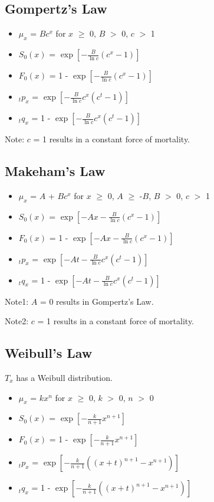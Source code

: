 \documentclass[]{book}
\begin{document}
\subsection{Gompertz's Law}\label{gompertzs-law}

\begin{itemize}
\item
  \(\mu_x\) = \(Bc^x\) for \(x\) \(\ge\) 0, \(B\) \(>\) 0, \(c\) \(>\) 1
\item
  \(S_0(x)\) = \(\exp[-\frac{B}{\ln c}(c^x - 1)]\)
\item
  \(F_0(x)\) = 1 - \(\exp[-\frac{B}{\ln c}(c^x - 1)]\)
\item
  \({}_{t}p_x\) = \(\exp[-\frac{B}{\ln c}c^x(c^t - 1)]\)
\item
  \({}_{t}q_x\) = 1 - \(\exp[-\frac{B}{\ln c}c^x(c^t - 1)]\)
\end{itemize}

Note: \(c\) = 1 results in a constant force of mortality.

\subsection{Makeham's Law}\label{makehams-law}

\begin{itemize}
\item
  \(\mu_x\) = \(A\) + \(Bc^x\) for \(x\) \(\ge\) 0, \(A\) \(\ge\)
  -\(B\), \(B\) \(>\) 0, \(c\) \(>\) 1
\item
  \(S_0(x)\) = \(\exp[-Ax - \frac{B}{\ln c}(c^x - 1)]\)
\item
  \(F_0(x)\) = 1 - \(\exp[-Ax - \frac{B}{\ln c}(c^x - 1)]\)
\item
  \({}_{t}p_x\) = \(\exp[-At - \frac{B}{\ln c}c^x(c^t - 1)]\)
\item
  \({}_{t}q_x\) = 1 - \(\exp[-At - \frac{B}{\ln c}c^x(c^t - 1)]\)
\end{itemize}

Note1: \(A\) = 0 results in Gompertz's Law.

Note2: \(c\) = 1 results in a constant force of mortality.

\subsection{Weibull's Law}\label{weibulls-law}

\(T_x\) has a Weibull distribution.

\begin{itemize}
\item
  \(\mu_x\) = \(k\)\(x^n\) for \(x\) \(\ge\) 0, \(k\) \(>\) 0, \(n\)
  \(>\) 0
\item
  \(S_0(x)\) = \(\exp[-\frac{k}{n + 1}x^{n + 1}]\)
\item
  \(F_0(x)\) = 1 - \(\exp[-\frac{k}{n + 1}x^{n + 1}]\)
\item
  \({}_{t}p_x\) =
  \(\exp[-\frac{k}{n + 1}((x + t)^{n + 1} - x^{n + 1})]\)
\item
  \({}_{t}q_x\) = 1 -
  \(\exp[-\frac{k}{n + 1}((x + t)^{n + 1} - x^{n + 1})]\)
\end{itemize}
\end{document}
